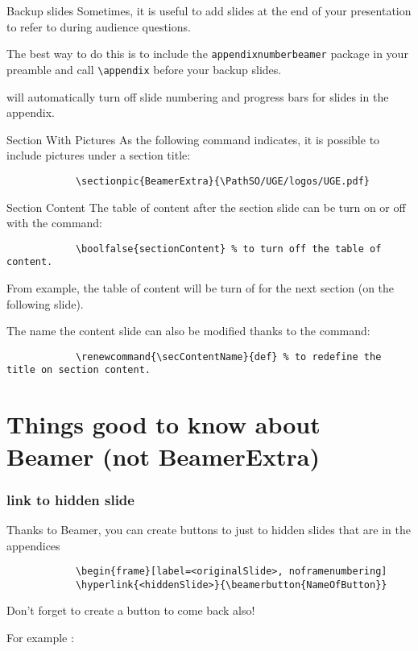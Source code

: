 	
	\begin{frame}[fragile]{Backup slides}
		Sometimes, it is useful to add slides at the end of your presentation to
		refer to during audience questions.
		
		The best way to do this is to include the \verb|appendixnumberbeamer|
		package in your preamble and call \verb|\appendix| before your backup slides.
		
		\themename will automatically turn off slide numbering and progress bars for
		slides in the appendix.
	\end{frame}
	
	\begin{frame}[fragile, label=previouSlide]{Section With Pictures}
		As the following command indicates, it is possible to include pictures under a section title:
		\begin{verbatim}			
			\sectionpic{BeamerExtra}{\PathSO/UGE/logos/UGE.pdf}		
		\end{verbatim}
	\end{frame}

	\begin{frame}[fragile]{Section Content}
		The table of content after the section slide can be turn on or off with the command:
		\begin{verbatim}
			\boolfalse{sectionContent} % to turn off the table of content.
		\end{verbatim}
	
		From example, the table of content will be turn of for the next section (on the following slide).

		The name the content slide can also be modified thanks to the command:
		\begin{verbatim}
			\renewcommand{\secContentName}{def} % to redefine the title on section content.
		\end{verbatim}
	\end{frame}
	
	\renewcommand{\secContentName}{refined name}
\section{Things good to know about Beamer (not BeamerExtra)}
	
	\begin{frame}[fragile]
		\frametitle{link to hidden slide}
		
		Thanks to Beamer, you can create buttons to just to hidden slides that are in the appendices
		\begin{verbatim}			
			\begin{frame}[label=<originalSlide>, noframenumbering]	
			\hyperlink{<hiddenSlide>}{\beamerbutton{NameOfButton}}
		\end{verbatim}
		
		Don't forget to create a button to come back also!
		
		For example :
		\hyperlink{previouSlide}{}
	\end{frame}
	
